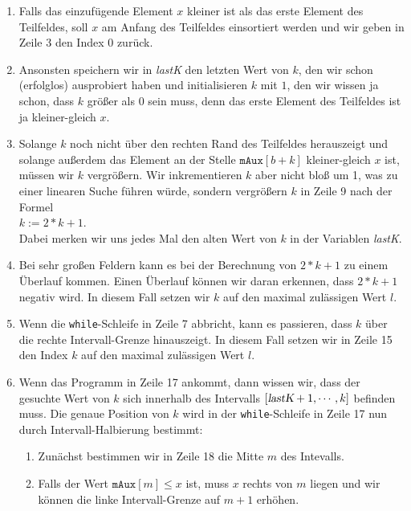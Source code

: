 \begin{enumerate}
\item Falls das einzuf\"ugende Element $x$ kleiner ist als das erste Element des Teilfeldes,
      soll $x$ am Anfang des Teilfeldes einsortiert werden und wir geben in Zeile
      3 den Index 0 zur\"uck.
\item Ansonsten speichern wir in \textsl{lastK} den letzten Wert von $k$, den wir schon
      (erfolglos) ausprobiert haben und initialisieren $k$ mit $1$, den wir wissen ja schon,
      dass $k$ gr\"o{\ss}er als $0$ sein muss, denn das erste Element des Teilfeldes ist ja kleiner-gleich
      $x$.
\item Solange $k$ noch nicht \"uber den rechten Rand des Teilfeldes herauszeigt und solange au{\ss}erdem
      das Element an der Stelle $\mathtt{mAux}[b + k]$ kleiner-gleich $x$ ist, m\"ussen wir $k$ vergr\"o{\ss}ern.
      Wir inkrementieren $k$ aber nicht blo{\ss} um 1, was zu einer linearen Suche f\"uhren w\"urde, sondern
      vergr\"o{\ss}ern $k$ in Zeile 9 nach der Formel
      \\[0.2cm]
      \hspace*{1.3cm}
      $k := 2 * k + 1$.
      \\[0.2cm]
      Dabei merken wir uns jedes Mal den alten Wert von $k$ in der Variablen \textsl{lastK}.
\item Bei sehr gro{\ss}en Feldern kann es bei der Berechnung von $2 * k + 1$ zu einem
      \"Uberlauf kommen.  Einen \"Uberlauf k\"onnen wir daran erkennen, dass $2 * k + 1$ negativ wird.
      In diesem Fall setzen wir $k$ auf den maximal zul\"assigen Wert $l$.
\item Wenn die \texttt{while}-Schleife in Zeile 7 abbricht, kann es passieren, dass $k$ \"uber die
      rechte Intervall-Grenze 
      hinauszeigt.  In diesem Fall setzen wir in Zeile 15 den Index $k$ auf den maximal zul\"assigen Wert $l$.
\item Wenn das Programm in Zeile 17 ankommt, dann wissen wir, dass der gesuchte Wert von $k$ sich
      innerhalb des Intervalls $[\textsl{lastK}+ 1, \cdots, k]$ befinden muss.  Die genaue Position
      von $k$ wird in der \texttt{while}-Schleife in Zeile 17 nun durch Intervall-Halbierung
      bestimmt:
      \begin{enumerate}
      \item Zun\"achst bestimmen wir in Zeile 18 die Mitte $m$ des Intevalls.
      \item Falls der Wert $\mathtt{mAux}[m] \leq x$ ist, muss $x$ rechts von $m$ liegen
            und wir k\"onnen die linke Intervall-Grenze auf $m+1$ erh\"ohen.

\end{enumerate}
\end{enumerate}
